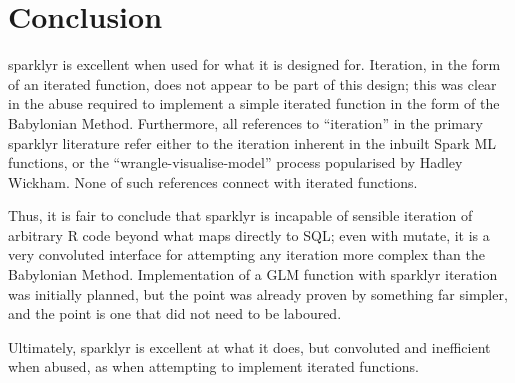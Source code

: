 \documentclass[10pt,a4paper]{article}
\begin{document}

\section{Conclusion}\label{sec:conclusion}

sparklyr is excellent when used for what it is designed for.
Iteration, in the form of an iterated function, does not appear to be part of
this design;
this was clear in the abuse required to implement a simple iterated function in
the form of the Babylonian Method.
Furthermore, all references to ``iteration'' in the primary sparklyr literature
refer either to the iteration inherent in the inbuilt Spark ML functions, or
the ``wrangle-visualise-model'' process popularised by Hadley
Wickham\cite{luraschi2019mastering}\cite{wickham2016r}.
None of such references connect with iterated functions.

Thus, it is fair to conclude that sparklyr is incapable of sensible iteration
of arbitrary R code beyond what maps directly to SQL; 
even with mutate, it is a very convoluted interface for attempting any
iteration more complex than the Babylonian Method.
Implementation of a GLM function with sparklyr iteration was initially planned,
but the point was already proven by something far simpler, and the point is one
that did not need to be laboured.

Ultimately, sparklyr is excellent at what it does, but convoluted and inefficient when
abused, as when attempting to implement iterated functions.

\printbibliography{}
\end{document}
